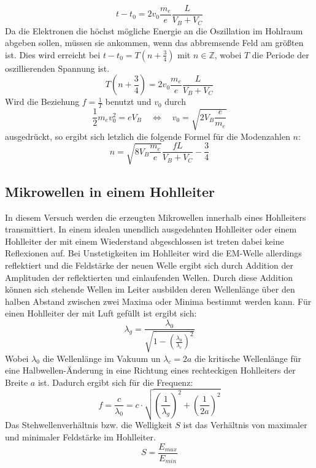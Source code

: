         \begin{equation*}
            t - t_0 = 2 v_0 \frac{m_e}{e} \frac{L}{V_B + V_C}
        \end{equation*}
        Da die Elektronen die höchst mögliche Energie an die Oszillation im Hohlraum abgeben sollen, müssen sie ankommen, wenn das abbremsende Feld am größten ist.
        Dies wird erreicht bei $t - t_0 = T (n + \frac{3}{4})$ mit $n \in \mathbb{Z}$, wobei $T$ die Periode der oszillierenden Spannung ist.
        \begin{equation*}
            T \left(n + \frac{3}{4} \right) = 2 v_0 \frac{m_e}{e} \frac{L}{V_B + V_C}
        \end{equation*}
        Wird die Beziehung $f = \frac{1}{T}$ benutzt und $v_0$ durch
        \begin{equation*}
            \frac{1}{2} m_e v_0^2 = e V_B \quad \Leftrightarrow \quad v_0 = \sqrt{2 V_B \frac{e}{m_e}}
        \end{equation*}
        ausgedrückt, so ergibt sich letzlich die folgende Formel für die Modenzahlen $n$:
        \begin{equation}
            \label{eqn:moden}
            n = \sqrt{8 V_B \frac{m_e}{e}} \frac{f L}{V_B + V_C} - \frac{3}{4}
        \end{equation}

    \newpage
    \subsection{Mikrowellen in einem Hohlleiter}
    \label{sec:Hohlleiter}
        In diesem Versuch werden die erzeugten Mikrowellen innerhalb eines Hohlleiters transmittiert.
        In einem idealen unendlich ausgedehnten Hohlleiter oder einem Hohlleiter der mit einem Wiederstand abgeschlossen ist treten dabei keine Reflexionen auf.
        Bei Unstetigkeiten im Hohlleiter wird die EM-Welle allerdings reflektiert und die Feldstärke der neuen Welle ergibt sich durch Addition der Amplituden der reflektierten und einlaufenden Wellen.
        Durch diese Addition können sich stehende Wellen im Leiter ausbilden deren Wellenlänge über den halben Abstand zwischen zwei Maxima oder Minima bestimmt werden kann.
        Für einen Hohlleiter der mit Luft gefüllt ist ergibt sich:
        \begin{equation}
            \lambda_g = \frac{\lambda_0}{\sqrt{1-\left(\frac{\lambda_0}{\lambda_c}\right)^2}}
        \end{equation}
        Wobei $\lambda_0$ die Wellenlänge im Vakuum un $\lambda_c = 2a$ die kritische Wellenlänge für eine Halbwellen-Änderung in eine Richtung eines rechteckigen Hohlleiters der Breite $a$ ist.
        Dadurch ergibt sich für die Frequenz:
        \begin{equation}
            \label{eqn:frequenz}
            f = \frac{c}{\lambda_0} = c \cdot \sqrt{\left(\frac{1}{\lambda_g}\right)^2 + \left(\frac{1}{2a}\right)^2}
        \end{equation}
        Das Stehwellenverhältnis bzw. die Welligkeit $S$ ist das Verhältnis von maximaler und minimaler Feldstärke im Hohlleiter.
        \begin{equation}
            S = \frac{E_{max}}{E_{min}}
        \end{equation}